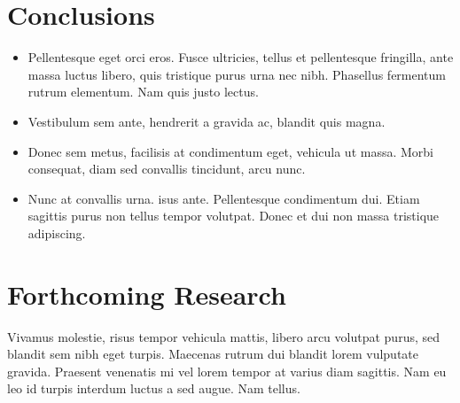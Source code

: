 \documentclass[a0,portrait]{a0poster}
\begin{document}
\begin{multicols}{2}

\color{SaddleBrown} %

\section*{Conclusions}

\begin{itemize}
\item Pellentesque eget orci eros. Fusce ultricies, tellus et pellentesque fringilla, ante massa luctus libero, quis tristique purus urna nec nibh. Phasellus fermentum rutrum elementum. Nam quis justo lectus.
\item Vestibulum sem ante, hendrerit a gravida ac, blandit quis magna.
\item Donec sem metus, facilisis at condimentum eget, vehicula ut massa. Morbi consequat, diam sed convallis tincidunt, arcu nunc.
\item Nunc at convallis urna. isus ante. Pellentesque condimentum dui. Etiam sagittis purus non tellus tempor volutpat. Donec et dui non massa tristique adipiscing.
\end{itemize}

\color{DarkSlateGray} %


\section*{Forthcoming Research}

Vivamus molestie, risus tempor vehicula mattis, libero arcu volutpat purus, sed blandit sem nibh eget turpis. Maecenas rutrum dui blandit lorem vulputate gravida. Praesent venenatis mi vel lorem tempor at varius diam sagittis. Nam eu leo id turpis interdum luctus a sed augue. Nam tellus.



\end{multicols}
\end{document}
